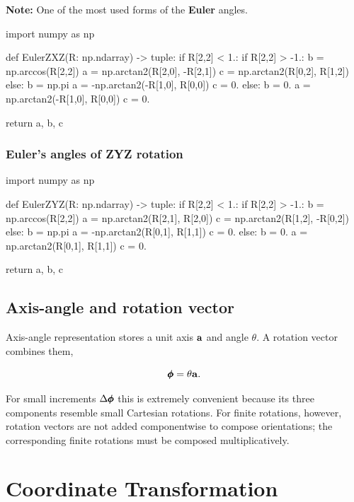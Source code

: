         \textbf{Note:} One of the most used forms of the \textbf{Euler} angles.

\begin{python}
import numpy as np

def EulerZXZ(R: np.ndarray) -> tuple:
    if R[2,2] < 1.:
        if R[2,2] > -1.:
            b = np.arccos(R[2,2])
            a = np.arctan2(R[2,0], -R[2,1])
            c = np.arctan2(R[0,2], R[1,2])
        else:
            b = np.pi
            a = -np.arctan2(-R[1,0], R[0,0])
            c = 0.
    else:
        b = 0.
        a = np.arctan2(-R[1,0], R[0,0])
        c = 0.

    return a, b, c
\end{python}

\subsubsection{Euler's angles of \textbf{ZYZ} rotation}

\begin{python}
import numpy as np

def EulerZYZ(R: np.ndarray) -> tuple:
    if R[2,2] < 1.:
        if R[2,2] > -1.:
            b = np.arccos(R[2,2])
            a = np.arctan2(R[2,1], R[2,0])
            c = np.arctan2(R[1,2], -R[0,2])
        else:
            b = np.pi
            a = -np.arctan2(R[0,1], R[1,1])
            c = 0.
    else:
        b = 0.
        a = np.arctan2(R[0,1], R[1,1])
        c = 0.

    return a, b, c
\end{python}


\subsection{Axis-angle and rotation vector}

Axis-angle representation stores a unit axis $\mathbf{a}$ and angle $\theta$. A
rotation vector combines them,

\begin{equation}
    \pmb{\phi}=\theta\mathbf{a}.
\end{equation}

For small increments $\Delta\pmb{\phi}$ this is extremely convenient because its
three components resemble small Cartesian rotations. For finite rotations,
however, rotation vectors are not added componentwise to compose orientations;
the corresponding finite rotations must be composed multiplicatively.

\section{Coordinate Transformation}

